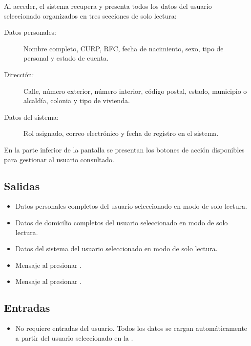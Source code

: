 Al acceder, el sistema recupera y presenta todos los datos del usuario 
seleccionado organizados en tres secciones de solo lectura:

\begin{description}
	\item[Datos personales:] Nombre completo, CURP, RFC, fecha de 
	nacimiento, sexo, tipo de personal y estado de cuenta.
	\item[Dirección:] Calle, número exterior, número interior, 
	código postal, estado, municipio o alcaldía, colonia y tipo 
	de vivienda.
	\item[Datos del sistema:] Rol asignado, correo electrónico 
	y fecha de registro en el sistema.
\end{description}

En la parte inferior de la pantalla se presentan los botones de 
acción disponibles para gestionar al usuario consultado.


\subsection{Salidas}
\begin{itemize}
	\item Datos personales completos del usuario seleccionado 
	en modo de solo lectura.
	\item Datos de domicilio completos del usuario seleccionado 
	en modo de solo lectura.
	\item Datos del sistema del usuario seleccionado en modo 
	de solo lectura.
	\item Mensaje  
	al presionar .
	\item Mensaje  
	al presionar .
\end{itemize}

\subsection{Entradas}
\begin{itemize}
	\item No requiere entradas del usuario. Todos los datos se 
	cargan automáticamente a partir del usuario seleccionado 
	en la .
\end{itemize}

